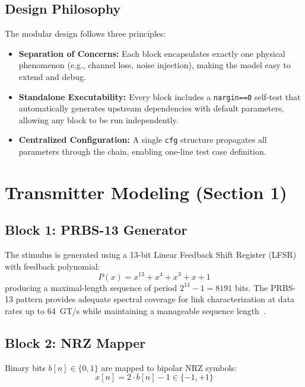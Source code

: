 \documentclass[conference]{IEEEtran}
\begin{document}
\subsection{Design Philosophy}

The modular design follows three principles:

\begin{itemize}
    \item \textbf{Separation of Concerns:} Each block encapsulates exactly one physical phenomenon (e.g., channel loss, noise injection), making the model easy to extend and debug.
    \item \textbf{Standalone Executability:} Every block includes a \texttt{nargin==0} self-test that automatically generates upstream dependencies with default parameters, allowing any block to be run independently.
    \item \textbf{Centralized Configuration:} A single \texttt{cfg} structure propagates all parameters through the chain, enabling one-line test case definition.
\end{itemize}

\section{Transmitter Modeling (Section 1)}

\subsection{Block 1: PRBS-13 Generator}

The stimulus is generated using a 13-bit Linear Feedback Shift Register (LFSR) with feedback polynomial:
\begin{equation}
    P(x) = x^{13} + x^4 + x^3 + x + 1
\end{equation}
producing a maximal-length sequence of period $2^{13}-1 = 8191$ bits. The PRBS-13 pattern provides adequate spectral coverage for link characterization at data rates up to 64~GT/s while maintaining a manageable sequence length~\cite{jeruchim2000}.

\subsection{Block 2: NRZ Mapper}

Binary bits $b[n] \in \{0, 1\}$ are mapped to bipolar NRZ symbols:
\begin{equation}
    x[n] = 2 \cdot b[n] - 1 \in \{-1, +1\}
\end{equation}
\end{document}
